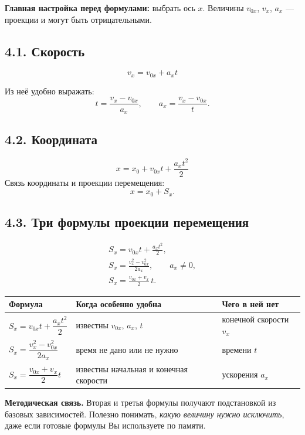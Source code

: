 \documentclass[a4paper,12pt]{article}
\newcommand{\key}[1]{\textbf{\color{darkaccent}#1}}
\newcommand{\formula}[1]{\[\displaystyle #1\]}
\newcommand{\headcell}[1]{\textbf{\color{darkaccent}#1}}
\begin{document}
\key{Главная настройка перед формулами:} выбрать ось $x$. Величины $v_{0x}$, $v_x$, $a_x$ --- проекции и могут быть отрицательными.

\subsection*{4.1. Скорость}
\formula{\boxed{v_x=v_{0x}+a_xt}}

Из неё удобно выражать:
\formula{t=\frac{v_x-v_{0x}}{a_x}, \qquad a_x=\frac{v_x-v_{0x}}{t}.}

\subsection*{4.2. Координата}
\formula{\boxed{x=x_0+v_{0x}t+\frac{a_xt^2}{2}}}
Связь координаты и проекции перемещения:
\formula{x=x_0+S_x.}

\subsection*{4.3. Три формулы проекции перемещения}
\begin{align*}
\boxed{S_x=v_{0x}t+\frac{a_xt^2}{2}},\\[3mm]
\boxed{S_x=\frac{v_x^2-v_{0x}^2}{2a_x}}, \qquad a_x\neq0,\\[3mm]
\boxed{S_x=\frac{v_{0x}+v_x}{2}\,t}.
\end{align*}

\begin{center}
\renewcommand{\arraystretch}{1.35}
\begin{tabularx}{0.97\linewidth}{@{}Y Y Y@{}}
\toprule
\headcell{Формула} & \headcell{Когда особенно удобна} & \headcell{Чего в ней нет} \\
\midrule
$S_x=v_{0x}t+\dfrac{a_xt^2}{2}$ & известны $v_{0x}$, $a_x$, $t$ & конечной скорости $v_x$ \\
$S_x=\dfrac{v_x^2-v_{0x}^2}{2a_x}$ & время не дано или не нужно & времени $t$ \\
$S_x=\dfrac{v_{0x}+v_x}{2}t$ & известны начальная и конечная скорости & ускорения $a_x$ \\
\bottomrule
\end{tabularx}
\end{center}

\key{Методическая связь.} Вторая и третья формулы получают подстановкой из базовых зависимостей. Полезно понимать, \emph{какую величину нужно исключить}, даже если готовые формулы Вы используете по памяти.
\end{document}
